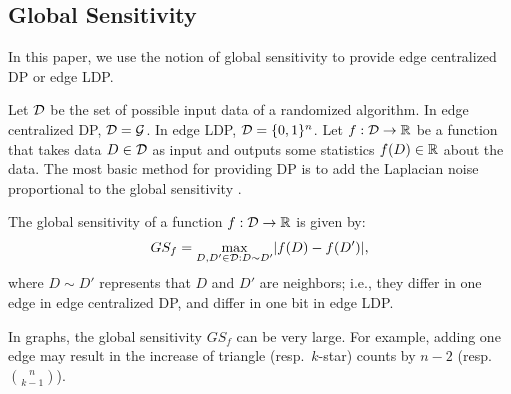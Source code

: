 \subsection{Global Sensitivity}
\label{sub:sensitivity}
In this paper, we use the notion of global sensitivity \cite{DP} to provide edge centralized DP or edge LDP.

Let $\mathcal{D}$ be the set of possible input data of a randomized algorithm. 
In edge centralized DP, $\mathcal{D} = \mathcal{G}$. 
In edge LDP, $\mathcal{D} = \{0,1\}^n$. 
Let $f: \mathcal{D} \rightarrow \mathbb{R}$ be a function that takes data $D \in \mathcal{D}$ as input and outputs some statistics $f(D) \in \mathbb{R}$ about the data. 
The most basic method for providing DP is to add the Laplacian noise proportional to the global sensitivity \cite{DP}.

\begin{definition}  \label{def:global_sen} 
The global sensitivity of a function $f: \mathcal{D} \rightarrow \mathbb{R}$ is given by:
\begin{align*}
GS_f = \underset{D,D' \in \mathcal{D}: D \sim D'}{\max} |f(D) - f(D')|,
\end{align*}
where $D \sim D'$ represents that $D$ and $D'$ are neighbors; i.e., they differ in one edge in edge centralized DP, and differ in one bit in edge LDP.
\end{definition}



In graphs, the global sensitivity $GS_f$ can be very large. 
For example, adding one edge may result in the increase of triangle (resp.~$k$-star) counts by $n-2$ (resp.~$\binom{n}{k-1}$). 

